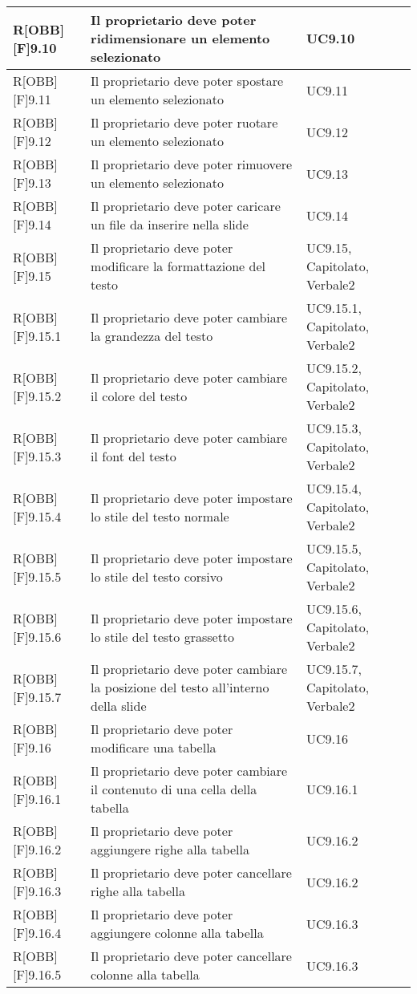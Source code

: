 	\begin{table}[h]
		\begin{tabular}{|p{}|p{}|p{}|}
			\midrule
			
			R[OBB][F]9.10 & Il proprietario deve poter ridimensionare un elemento selezionato & UC9.10 \\ \midrule
			R[OBB][F]9.11 & Il proprietario deve poter spostare un elemento selezionato & UC9.11 \\ \midrule
			R[OBB][F]9.12 & Il proprietario deve poter ruotare un elemento selezionato & UC9.12 \\ \midrule
			R[OBB][F]9.13 & Il proprietario deve poter rimuovere un elemento selezionato & UC9.13 \\ \midrule
			R[OBB][F]9.14 & Il proprietario deve poter caricare un file da inserire nella \gls{slide} & UC9.14 \\ \midrule
			R[OBB][F]9.15 & Il proprietario deve poter modificare la formattazione del testo & UC9.15, Capitolato, Verbale2 \\ \midrule
			R[OBB][F]9.15.1 & Il proprietario deve poter cambiare la grandezza del testo & UC9.15.1, Capitolato, Verbale2 \\ \midrule
			R[OBB][F]9.15.2 & Il proprietario deve poter cambiare il colore del testo & UC9.15.2, Capitolato, Verbale2 \\ \midrule
			R[OBB][F]9.15.3 & Il proprietario deve poter cambiare il \gls{font} del testo & UC9.15.3, Capitolato, Verbale2 \\ \midrule
			R[OBB][F]9.15.4 & Il proprietario deve poter impostare lo stile del testo normale & UC9.15.4, Capitolato, Verbale2 \\ \midrule
			R[OBB][F]9.15.5 & Il proprietario deve poter impostare lo stile del testo corsivo & UC9.15.5, Capitolato, Verbale2 \\ \midrule
			R[OBB][F]9.15.6 & Il proprietario deve poter impostare lo stile del testo grassetto & UC9.15.6, Capitolato, Verbale2 \\ \midrule
			R[OBB][F]9.15.7 & Il proprietario deve poter cambiare la posizione del testo all'interno della \gls{slide} & UC9.15.7, Capitolato, Verbale2 \\ \midrule
			R[OBB][F]9.16 & Il proprietario deve poter modificare una tabella & UC9.16 \\ \midrule
			R[OBB][F]9.16.1 & Il proprietario deve poter cambiare il contenuto di una cella della tabella & UC9.16.1 \\ \midrule
			R[OBB][F]9.16.2 & Il proprietario deve poter aggiungere righe alla tabella & UC9.16.2 \\ \midrule
			R[OBB][F]9.16.3 & Il proprietario deve poter cancellare righe alla tabella & UC9.16.2 \\ \midrule
			R[OBB][F]9.16.4 & Il proprietario deve poter aggiungere colonne alla tabella & UC9.16.3 \\ \midrule
			R[OBB][F]9.16.5 & Il proprietario deve poter cancellare colonne alla tabella & UC9.16.3 \\ \midrule

		\end{tabular}
	\end{table}
	\newpage
	
